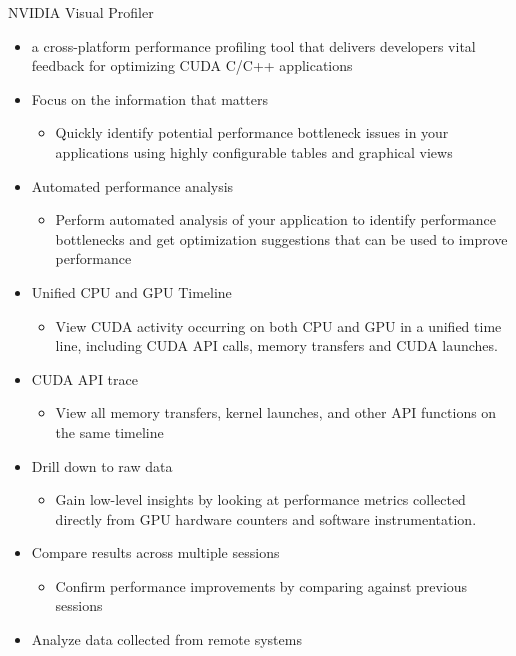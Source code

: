 \documentclass[10pt,t]{beamer}
\begin{document}
\begin{frame}[allowframebreaks]{NVIDIA Visual Profiler}
  \begin{itemize}
  \item a cross-platform performance profiling tool that delivers developers vital feedback for optimizing CUDA C/C++ applications
  \item Focus on the information that matters
    \begin{itemize}
    \item[] Quickly identify potential performance bottleneck issues in your applications using highly configurable tables and graphical views
    \end{itemize}
  \item Automated performance analysis
    \begin{itemize}
  \item[] Perform automated analysis of your application to identify performance bottlenecks and get optimization suggestions that can be used to improve performance
    \end{itemize}
  \item Unified CPU and GPU Timeline
    \begin{itemize}
  \item[] View CUDA activity occurring on both CPU and GPU in a unified time line, including CUDA API calls, memory transfers and CUDA launches.
    \end{itemize}
  \item CUDA API trace
    \begin{itemize}
  \item[] View all memory transfers, kernel launches, and other API functions on the same timeline
    \end{itemize}
  \item Drill down to raw data
    \begin{itemize}
  \item[] Gain low-level insights by looking at performance metrics collected directly from GPU hardware counters and software instrumentation.
    \end{itemize}
   \framebreak
  \item Compare results across multiple sessions
    \begin{itemize}
  \item[] Confirm performance improvements by comparing against previous sessions
    \end{itemize}
  \item Analyze data collected from remote systems

\end{itemize}
\end{frame}
\end{document}
